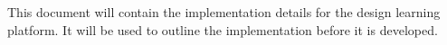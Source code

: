 This document will contain the implementation details for the design learning platform. It will be used to outline the implementation before it is developed.
